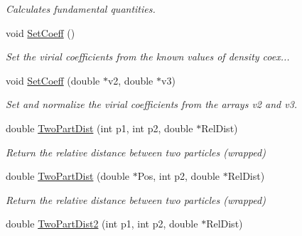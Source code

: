 \begin{DoxyCompactItemize}
\begin{DoxyCompactList}\small\item\em Calculates fundamental quantities. \end{DoxyCompactList}\item 
void \hyperlink{classVarData_a5dd46e77250756dc756a8a5aae0b575f}{Set\+Coeff} ()\hypertarget{classVarData_a5dd46e77250756dc756a8a5aae0b575f}{}\label{classVarData_a5dd46e77250756dc756a8a5aae0b575f}

\begin{DoxyCompactList}\small\item\em Set the virial coefficients from the known values of density coex... \end{DoxyCompactList}\item 
void \hyperlink{classVarData_a8e4611ad8a334d8a27c2fb87e7ea0df1}{Set\+Coeff} (double $\ast$v2, double $\ast$v3)\hypertarget{classVarData_a8e4611ad8a334d8a27c2fb87e7ea0df1}{}\label{classVarData_a8e4611ad8a334d8a27c2fb87e7ea0df1}

\begin{DoxyCompactList}\small\item\em Set and normalize the virial coefficients from the arrays v2 and v3. \end{DoxyCompactList}\item 
double \hyperlink{classVarData_a19886baf2914ac46bc50f333254a4e57}{Two\+Part\+Dist} (int p1, int p2, double $\ast$Rel\+Dist)\hypertarget{classVarData_a19886baf2914ac46bc50f333254a4e57}{}\label{classVarData_a19886baf2914ac46bc50f333254a4e57}

\begin{DoxyCompactList}\small\item\em Return the relative distance between two particles (wrapped) \end{DoxyCompactList}\item 
double \hyperlink{classVarData_a118d59dbacc06ea6d6b4f8e2cf864406}{Two\+Part\+Dist} (double $\ast$Pos, int p2, double $\ast$Rel\+Dist)\hypertarget{classVarData_a118d59dbacc06ea6d6b4f8e2cf864406}{}\label{classVarData_a118d59dbacc06ea6d6b4f8e2cf864406}

\begin{DoxyCompactList}\small\item\em Return the relative distance between two particles (wrapped) \end{DoxyCompactList}\item 
double \hyperlink{classVarData_a8c36154f85dd7e41560448d01aab695d}{Two\+Part\+Dist2} (int p1, int p2, double $\ast$Rel\+Dist)\hypertarget{classVarData_a8c36154f85dd7e41560448d01aab695d}{}\label{classVarData_a8c36154f85dd7e41560448d01aab695d}


\end{DoxyCompactItemize}
